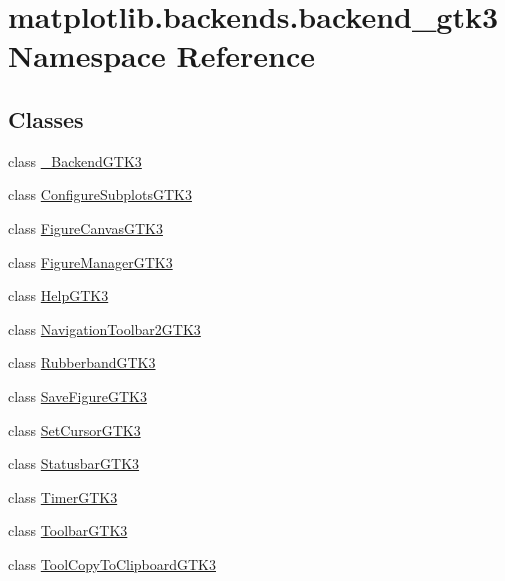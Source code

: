 \hypertarget{namespacematplotlib_1_1backends_1_1backend__gtk3}{}\section{matplotlib.\+backends.\+backend\+\_\+gtk3 Namespace Reference}
\label{namespacematplotlib_1_1backends_1_1backend__gtk3}
\subsection*{Classes}
\begin{DoxyCompactItemize}
\item 
class \hyperlink{classmatplotlib_1_1backends_1_1backend__gtk3_1_1__BackendGTK3}{\+\_\+\+Backend\+G\+T\+K3}
\item 
class \hyperlink{classmatplotlib_1_1backends_1_1backend__gtk3_1_1ConfigureSubplotsGTK3}{Configure\+Subplots\+G\+T\+K3}
\item 
class \hyperlink{classmatplotlib_1_1backends_1_1backend__gtk3_1_1FigureCanvasGTK3}{Figure\+Canvas\+G\+T\+K3}
\item 
class \hyperlink{classmatplotlib_1_1backends_1_1backend__gtk3_1_1FigureManagerGTK3}{Figure\+Manager\+G\+T\+K3}
\item 
class \hyperlink{classmatplotlib_1_1backends_1_1backend__gtk3_1_1HelpGTK3}{Help\+G\+T\+K3}
\item 
class \hyperlink{classmatplotlib_1_1backends_1_1backend__gtk3_1_1NavigationToolbar2GTK3}{Navigation\+Toolbar2\+G\+T\+K3}
\item 
class \hyperlink{classmatplotlib_1_1backends_1_1backend__gtk3_1_1RubberbandGTK3}{Rubberband\+G\+T\+K3}
\item 
class \hyperlink{classmatplotlib_1_1backends_1_1backend__gtk3_1_1SaveFigureGTK3}{Save\+Figure\+G\+T\+K3}
\item 
class \hyperlink{classmatplotlib_1_1backends_1_1backend__gtk3_1_1SetCursorGTK3}{Set\+Cursor\+G\+T\+K3}
\item 
class \hyperlink{classmatplotlib_1_1backends_1_1backend__gtk3_1_1StatusbarGTK3}{Statusbar\+G\+T\+K3}
\item 
class \hyperlink{classmatplotlib_1_1backends_1_1backend__gtk3_1_1TimerGTK3}{Timer\+G\+T\+K3}
\item 
class \hyperlink{classmatplotlib_1_1backends_1_1backend__gtk3_1_1ToolbarGTK3}{Toolbar\+G\+T\+K3}
\item 
class \hyperlink{classmatplotlib_1_1backends_1_1backend__gtk3_1_1ToolCopyToClipboardGTK3}{Tool\+Copy\+To\+Clipboard\+G\+T\+K3}
\end{DoxyCompactItemize}
